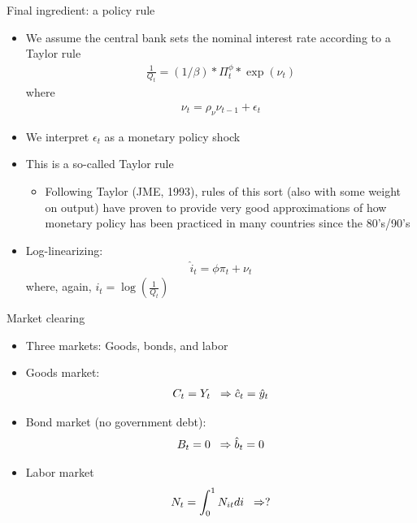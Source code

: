 \documentclass[9pt,xcolor={dvipsnames}]{beamer}
\newcommand{\bit}{\begin{itemize}}
\newcommand{\eit}{\end{itemize}}
\newcommand{\bc}{\color{blue}}
\begin{document}
\begin{frame}{Final ingredient: a policy rule}

\bit
\setlength\itemsep{1.5em}

\item We assume the central bank sets the nominal interest rate according to a Taylor rule
\begin{eqnarray}
\frac{1}{Q_t} = (1/\beta) * \Pi_t^{\phi}*\exp(\nu_t) \nonumber
\end{eqnarray}
where
\begin{eqnarray}
\nu_t = \rho_{\nu} \nu_{t-1} + \epsilon_t \nonumber
\end{eqnarray}

\item We interpret $\epsilon_{t}$ as a monetary policy shock

\item This is a so-called {\bc Taylor rule}
\bit
	\item Following Taylor (JME, 1993), rules of this sort (also with some weight on output) have proven to provide very good approximations of how monetary policy has been practiced in many countries since the 80's/90's
\eit

\item Log-linearizing:
\begin{eqnarray}
\hat i_t = \phi \pi_t + \nu_t \nonumber
\end{eqnarray}
where, again, $i_t = \log \left(\frac{1}{Q_t}\right)$

\eit

\end{frame}


\begin{frame}{Market clearing}

\bit
\setlength\itemsep{1.5em}

\item Three markets: Goods, bonds, and labor

\item Goods market:
\begin{eqnarray}
C_t = Y_t  \hspace{2mm} \Rightarrow \hat c_t = \hat y_t \nonumber
\end{eqnarray}

\item Bond market (no government debt):
\begin{eqnarray}
B_t = 0 \hspace{2mm} \Rightarrow \hat b_t = 0 \nonumber
\end{eqnarray}

\item Labor market
\begin{eqnarray}
N_t = \int_{0}^{1} N_{it} di \hspace{2mm} \Rightarrow ? \nonumber
\end{eqnarray}
\eit

\end{frame}
\end{document}
